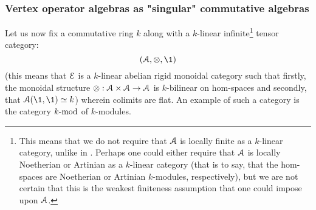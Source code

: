         \subsubsection{Vertex operator algebras as "singular" commutative algebras}
            \begin{convention}
                Let us now fix a commutative ring $k$ along with a $k$-linear infinite\footnote{This means that we do not require that $\calA$ is locally finite as a $k$-linear category, unlike in \cite[Definition 4.1.1]{EGNO}. Perhaps one could either require that $\calA$ is locally Noetherian or Artinian as a $k$-linear category (that is to say, that the hom-spaces are Noetherian or Artinian $k$-modules, respectively), but we are not certain that this is the weakest finiteness assumption that one could impose upon $\calA$.} tensor category:
                    $$(\calA, \tensor, \1)$$
                (this means that $\E$ is a $k$-linear abelian rigid monoidal category such that firstly, the monoidal structure $\tensor: \calA \x \calA \to \calA$ is $k$-bilinear on hom-spaces and secondly, that $\calA(\1, \1) \cong k$) wherein colimits are flat. An example of such a category is the category $k\mod$ of $k$-modules. 
            \end{convention}
